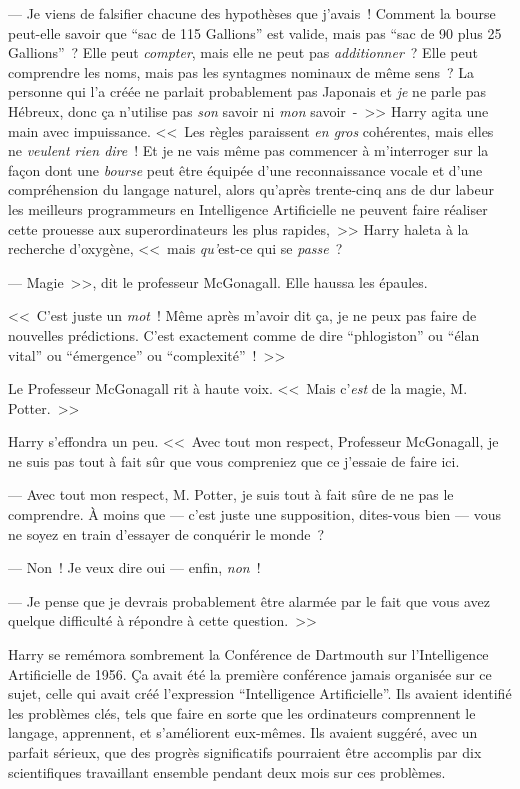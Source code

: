 --- Je viens de falsifier chacune des hypothèses que j'avais~! Comment la bourse peut-elle savoir que “sac de 115 Gallions” est valide, mais pas “sac de 90 plus 25 Gallions”~? Elle peut \emph{compter}, mais elle ne peut pas \emph{additionner}~? Elle peut comprendre les noms, mais pas les syntagmes nominaux de même sens~? La personne qui l'a créée ne parlait probablement pas Japonais et \emph{je} ne parle pas Hébreux, donc ça n'utilise pas \emph{son} savoir ni \emph{mon} savoir~-~>> Harry agita une main avec impuissance. <<~Les règles paraissent \emph{en gros} cohérentes, mais elles ne \emph{veulent rien dire}~! Et je ne vais même pas commencer à m'interroger sur la façon dont une \emph{bourse} peut être équipée d'une reconnaissance vocale et d'une compréhension du langage naturel, alors qu'après trente-cinq ans de dur labeur les meilleurs programmeurs en Intelligence Artificielle ne peuvent faire réaliser cette prouesse aux superordinateurs les plus rapides,~>> Harry haleta à la recherche d'oxygène, <<~mais \emph{qu'}est-ce qui se \emph{passe}~?

--- Magie~>>, dit le professeur McGonagall. Elle haussa les épaules.

<<~C'est juste un \emph{mot}~! Même après m'avoir dit ça, je ne peux pas faire de nouvelles prédictions. C'est exactement comme de dire “phlogiston” ou “élan vital” ou “émergence” ou “complexité”~!~>>

Le Professeur McGonagall rit à haute voix. <<~Mais c'\emph{est} de la magie, M. Potter.~>>

Harry s'effondra un peu. <<~Avec tout mon respect, Professeur McGonagall, je ne suis pas tout à fait sûr que vous compreniez que ce j'essaie de faire ici.

--- Avec tout mon respect, M. Potter, je suis tout à fait sûre de ne pas le comprendre. À moins que — c'est juste une supposition, dites-vous bien — vous ne soyez en train d'essayer de conquérir le monde~?

--- Non~! Je veux dire oui — enfin, \emph{non}~!

--- Je pense que je devrais probablement être alarmée par le fait que vous avez quelque difficulté à répondre à cette question.~>>

Harry se remémora sombrement la Conférence de Dartmouth sur l'Intelligence Artificielle de 1956. Ça avait été la première conférence jamais organisée sur ce sujet, celle qui avait créé l'expression “Intelligence Artificielle”. Ils avaient identifié les problèmes clés, tels que faire en sorte que les ordinateurs comprennent le langage, apprennent, et s'améliorent eux-mêmes. Ils avaient suggéré, avec un parfait sérieux, que des progrès significatifs pourraient être accomplis par dix scientifiques travaillant ensemble pendant deux mois sur ces problèmes.


